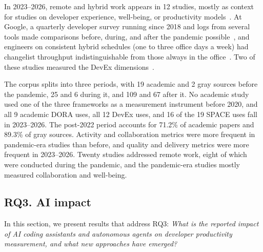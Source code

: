 \documentclass[preprint,number]{elsarticle}
\newcounter{study}
\begin{document}
In 2023--2026, remote and hybrid work appears in 12 studies, mostly as context for studies on developer experience, well-being, or productivity models~\cite{P0473, P2056, P2021}. At Google, a quarterly developer survey running since 2018 and logs from several tools made comparisons before, during, and after the pandemic possible~\cite{P2112, P2125}, and engineers on consistent hybrid schedules (one to three office days a week) had changelist throughput indistinguishable from those always in the office~\cite{P2086}. Two of these studies measured the DevEx dimensions~\cite{P0001, P1280}.

\begin{tcolorbox}[colback=gray!5, colframe=gray!50, title={\textbf{Summary of RQ2}}, fonttitle=\small]
\footnotesize
The corpus splits into three periods, with 19 academic and 2 gray sources before the pandemic, 25 and 6 during it, and 109 and 67 after it. No academic study used one of the three frameworks as a measurement instrument before 2020, and all 9 academic DORA uses, all 12 DevEx uses, and 16 of the 19 SPACE uses fall in 2023--2026. The post-2022 period accounts for 71.2\% of academic papers and 89.3\% of gray sources. Activity and collaboration metrics were more frequent in pandemic-era studies than before, and quality and delivery metrics were more frequent in 2023--2026. Twenty studies addressed remote work, eight of which were conducted during the pandemic, and the pandemic-era studies mostly measured collaboration and well-being.
\end{tcolorbox}

\subsection{RQ3. AI impact}
\label{sec:rq3}

In this section, we present results that address RQ3: \textit{What is the reported impact of AI coding assistants and autonomous agents on developer productivity measurement, and what new approaches have emerged?}
\end{document}
